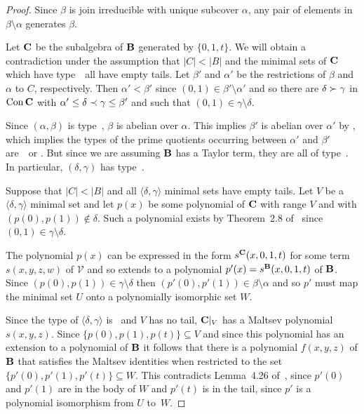 \begin{proof}
Since $\beta$ is join irreducible with unique subcover $\alpha$, any
pair of elements in $\beta \setminus \alpha$ generates $\beta$.

Let $\mathbf{C}$ be the subalgebra of $\mathbf{B}$ generated by $\{0,1,t\}$. We
will obtain a contradiction under the assumption that $|C| < |B|$
and the minimal sets of $\mathbf{C}$ which have type~\atyp\ all 
have empty tails. Let $\beta'$
and $\alpha'$ be the restrictions of $\beta$ and $\alpha $ to $C$,
respectively. Then $\alpha' < \beta'$ since $(0,1) \in
\beta'\setminus \alpha'$ and so there are $\delta \succ \gamma$ in
$\operatorname{Con}{\mathbf{C}}$ with $\alpha' \le \delta \prec \gamma \le \beta'$ and
such that $(0,1) \in \gamma\setminus \delta$.

Since $(\alpha,\beta)$ is type~\atyp, $\beta$ is abelian over $\alpha$.
This implies $\beta'$ is abelian over $\alpha'$ 
by \cite[Lemma 2.19(9)]{MR3076179},
which implies the
types of the prime quotients occurring between $\alpha'$ and $\beta'$
are~\utyp\ or \atyp.
But since we are assuming $\mathbf{B}$ has a Taylor term,
they are all of type~\atyp. 
In particular, $(\delta,\gamma)$ has type~\atyp.

Suppose that $|C| < |B|$ and all $\langle \delta, \gamma \rangle$
minimal sets have empty tails. Let $V$ be a $\langle \delta,\gamma
\rangle$ minimal set and let $p(x)$ be some polynomial of $\mathbf{C}$
with range $V$ and with $(p(0) ,p(1))\notin \delta$. Such a
polynomial exists by Theorem~2.8 of~\cite{HM:1988}
since $(0,1) \in \gamma\setminus \delta$.

The polynomial $p(x)$ can be expressed in the form 
$s^{\mathbf{C}}(x,0,1,t)$ for some term $s(x,y,z,w)$ 
of $\mathcal V$ and so extends to
a polynomial $p'(x) = s^{\mathbf{B}}(x,0,1,t)$ of $\mathbf{B}$.  Since $(p(0),
p(1)) \in \gamma\setminus \delta$ then $(p'(0), p'(1)) \in
\beta\setminus \alpha$ and so $p'$ must map the minimal set $U$ onto
a polynomially isomorphic set $W$.   

Since the type of $\langle \delta, \gamma \rangle$ is \atyp\ 
and $V$ has no tail,   
$\mathbf{C}|_V$ has a Maltsev polynomial $s(x,y,z)$. 
Since $\{p(0), p(1),p(t)\} \subseteq V$ and 
since this polynomial has an extension to a
polynomial of $\mathbf{B}$ it follows that there is a polynomial
$f(x,y,z)$ of $\mathbf{B}$ that satisfies the Maltsev identities when
restricted to the set $\{p'(0), p'(1), p'(t)\} \subseteq W$. This
contradicts Lemma~4.26 of~\cite{HM:1988}, since $p'(0)$ and $p'(1)$
are in the body of $W$ and $p'(t)$ is in the tail, since $p'$ is a
polynomial isomorphism from $U$ to~$W$.
\end{proof}


